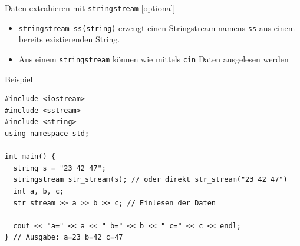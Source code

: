 \documentclass[presentation]{beamer}
\begin{document}
\begin{frame}[label={sec:orgd384447},fragile]{Daten extrahieren mit {\color{solarizedYellow}\texttt{stringstream}} [optional]}
 \begin{itemize}
\item {\color{solarizedYellow}\verb!stringstream ss(string)!} erzeugt einen Stringstream namens {\color{solarizedYellow}\verb!ss!} aus
einem bereits existierenden String.
\item Aus einem {\color{solarizedYellow}\verb!stringstream!} können wie mittels {\color{solarizedYellow}\verb!cin!} Daten ausgelesen
werden
\end{itemize}
\begin{exampleblock}{Beispiel}
\begin{verbatim}
#include <iostream>
#include <sstream>
#include <string>
using namespace std;

int main() {
  string s = "23 42 47";
  stringstream str_stream(s); // oder direkt str_stream("23 42 47")
  int a, b, c;
  str_stream >> a >> b >> c; // Einlesen der Daten

  cout << "a=" << a << " b=" << b << " c=" << c << endl;
} // Ausgabe: a=23 b=42 c=47
\end{verbatim}
\end{exampleblock}
\end{frame}
\end{document}
